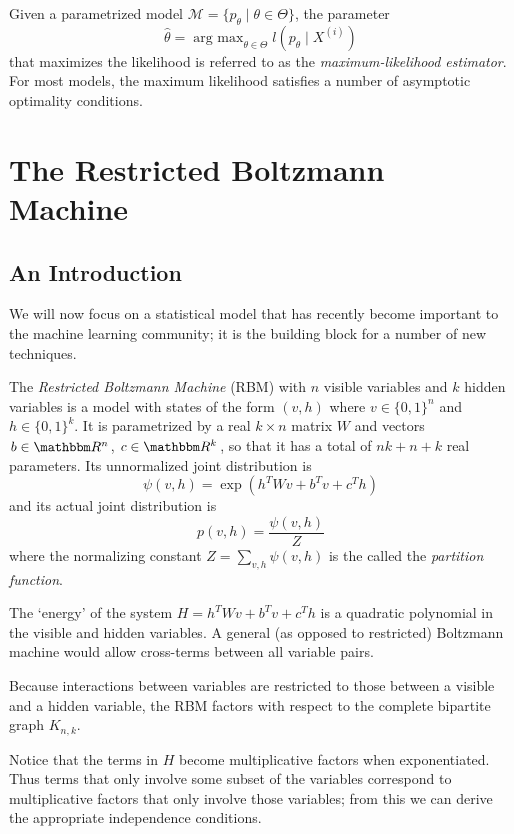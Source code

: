 \documentclass[11pt,titlepage]{article}
\newcommand*{\Mod}{\mathcal{M}}
\DeclareMathOperator*{\argmax}{arg\ max}
\begin{document}
    Given a parametrized model $\Mod = \{p_\theta \mid \theta \in \Theta\}$, the
    parameter 
    \[
        \hat\theta = \argmax_{\theta \in \Theta} l(p_\theta \mid X^{(i)})
    \]
    that maximizes the likelihood is referred to as the \emph{maximum-likelihood
    estimator}.  For most models, the maximum likelihood satisfies a number of
    asymptotic optimality conditions.


\section{The Restricted Boltzmann Machine}

\subsection{An Introduction}
    We will now focus on a statistical model that has recently become important
    to the machine learning community; it is the building block for a number of
    new techniques.
    \begin{definition}
    The \emph{Restricted Boltzmann Machine} (RBM) with $n$ visible variables and
    $k$ hidden variables is a model with states of the form $(v, h)$ where $v
    \in \{0,1\}^n$ and $h \in \{0,1\}^k$.  It is parametrized by a real $k
    \times n$ matrix $W$ and vectors $b \in \R^n$, $c \in \R^k$, so that it has
    a total of $nk + n + k$ real parameters.  Its unnormalized joint
    distribution is
    \[
        \psi(v, h) = \exp(h^T W v + b^Tv + c^T h)
    \]
    and its actual joint distribution is 
    \[
        p(v, h) = \frac{\psi(v,h)}{Z}
    \] 
    where the normalizing constant $Z = \sum_{v,h} \psi(v, h)$ is the called the
    \emph{partition function}.  
    \end{definition}

    The `energy' of the system $H = h^T W v + b ^T v + c^T h$ is a quadratic
    polynomial in the visible and hidden variables.  A general (as opposed to
    restricted) Boltzmann machine would allow cross-terms between all variable
    pairs.

    Because interactions between variables are restricted to those between a
    visible and a hidden variable, the RBM factors with respect to the complete
    bipartite graph $K_{n,k}$.
    \begin{center}
    \end{center}
    Notice that the terms in $H$ become multiplicative factors when
    exponentiated.  Thus terms that only involve some subset of the variables
    correspond to multiplicative factors that only involve those variables; from
    this we can derive the appropriate independence conditions. 
    
\end{document}
